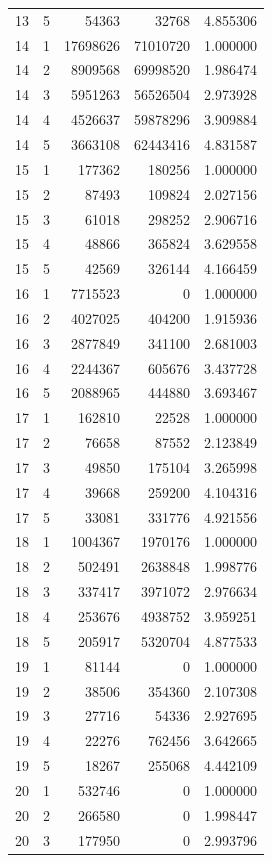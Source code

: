 \begin{longtable}{rrrrr}
13 & 5 & 54363 & 32768 & 4.855306 \\
14 & 1 & 17698626 & 71010720 & 1.000000 \\
14 & 2 & 8909568 & 69998520 & 1.986474 \\
14 & 3 & 5951263 & 56526504 & 2.973928 \\
14 & 4 & 4526637 & 59878296 & 3.909884 \\
14 & 5 & 3663108 & 62443416 & 4.831587 \\
15 & 1 & 177362 & 180256 & 1.000000 \\
15 & 2 & 87493 & 109824 & 2.027156 \\
15 & 3 & 61018 & 298252 & 2.906716 \\
15 & 4 & 48866 & 365824 & 3.629558 \\
15 & 5 & 42569 & 326144 & 4.166459 \\
16 & 1 & 7715523 & 0 & 1.000000 \\
16 & 2 & 4027025 & 404200 & 1.915936 \\
16 & 3 & 2877849 & 341100 & 2.681003 \\
16 & 4 & 2244367 & 605676 & 3.437728 \\
16 & 5 & 2088965 & 444880 & 3.693467 \\
17 & 1 & 162810 & 22528 & 1.000000 \\
17 & 2 & 76658 & 87552 & 2.123849 \\
17 & 3 & 49850 & 175104 & 3.265998 \\
17 & 4 & 39668 & 259200 & 4.104316 \\
17 & 5 & 33081 & 331776 & 4.921556 \\
18 & 1 & 1004367 & 1970176 & 1.000000 \\
18 & 2 & 502491 & 2638848 & 1.998776 \\
18 & 3 & 337417 & 3971072 & 2.976634 \\
18 & 4 & 253676 & 4938752 & 3.959251 \\
18 & 5 & 205917 & 5320704 & 4.877533 \\
19 & 1 & 81144 & 0 & 1.000000 \\
19 & 2 & 38506 & 354360 & 2.107308 \\
19 & 3 & 27716 & 54336 & 2.927695 \\
19 & 4 & 22276 & 762456 & 3.642665 \\
19 & 5 & 18267 & 255068 & 4.442109 \\
20 & 1 & 532746 & 0 & 1.000000 \\
20 & 2 & 266580 & 0 & 1.998447 \\
20 & 3 & 177950 & 0 & 2.993796 \\

\end{longtable}
